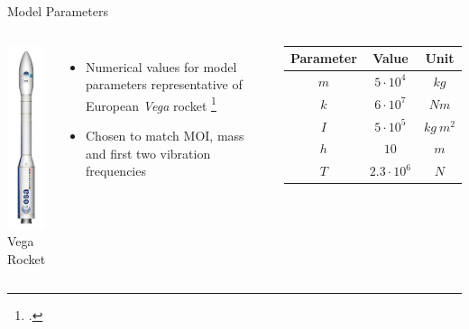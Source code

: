 \documentclass{beamer}
\begin{document}
\begin{frame}{Model Parameters}
\begin{columns}
\centering
\includegraphics[height=0.75\textheight]{images/Vega.png} \\
Vega Rocket
\begin{itemize}
\item Numerical values for model parameters representative of European \emph{Vega} rocket \footcite{Perez2006}
\item Chosen to match MOI, mass and first two vibration frequencies
\end{itemize}
\begin{table}
  \begin{center}
    \begin{tabular}{ ccc }
	\hline
           Parameter & Value & Unit \\
	\hline
      	$m$ & $5 \cdot 10^4$ & $kg$\\
      	$k$ & $6 \cdot 10^7$ & $Nm$\\
      	$I$ & $5 \cdot 10^5$ & $kg~m^2$\\
      	$h$ & $10$ & $m$\\
      	$T$ & $2.3 \cdot 10^6$ & $N$\\
    \end{tabular}
  \end{center}
\end{table}
\end{columns}

\end{frame}
\end{document}
